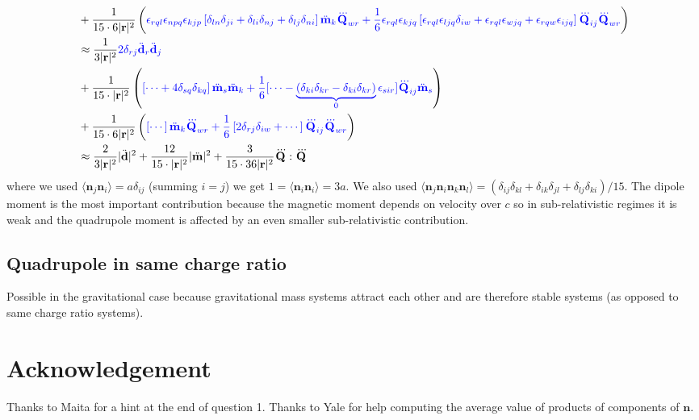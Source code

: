 \documentclass[10pt, a4paper]{article}
\begin{document}
{\begin{align*}
    &+ \dfrac{1}{15 \cdot 6|\mathbf{r}|^2}\left( \textcolor{blue}{\epsilon_{rq l}\epsilon_{npq} \epsilon_{kjp} \left[ \delta_{ln} \delta_{ji} + \delta_{li} \delta_{nj} + \delta_{lj}\delta_{ni} \right] \ddot{\mathbf{m}}_k \dddot{\mathbf{Q}}_{wr}  + \dfrac{1}{6} \epsilon_{rq l} \epsilon_{kj q}\left[ \epsilon_{rq l} \epsilon_{lj q} \delta_{iw} + \epsilon_{rq l} \epsilon_{wj q} + \epsilon_{rq w} \epsilon_{ij q} \right] \dddot{\mathbf{Q}}_{ij} \dddot{\mathbf{Q}}_{wr}} \right)\\
    &\approx \dfrac{1}{3|\mathbf{r}|^2}\textcolor{blue}{2 \delta_{rj}  \ddot{\mathbf{d}}_r\ddot{\mathbf{d}}_j} \\ 
    &+ \dfrac{1}{15\cdot |\mathbf{r}|^2} \left(\textcolor{blue}{ \left[ \cdots + 4\delta_{sq}\delta_{kq} \right] \ddot{\mathbf{m}}_s\ddot{\mathbf{m}}_k  + \dfrac{1}{6}[ \cdots -\underbrace{(\delta_{ki}\delta_{kr} - \delta_{ki}\delta_{kr})}_0 \epsilon_{sir}] \dddot{\mathbf{Q}}_{ij}\ddot{\mathbf{m}}_s} \right)\\
    &+ \dfrac{1}{15 \cdot 6|\mathbf{r}|^2}\left( \textcolor{blue}{ \left[ \cdots \right] \ddot{\mathbf{m}}_k \dddot{\mathbf{Q}}_{wr}  + \dfrac{1}{6} \left[2 \delta_{rj} \delta_{iw} + \cdots  \right] \dddot{\mathbf{Q}}_{ij} \dddot{\mathbf{Q}}_{wr}} \right)\\
    &\approx  \dfrac{2}{3|\mathbf{r}|^2}  |\ddot{\mathbf{d}}|^2 + \dfrac{12}{15\cdot |\mathbf{r}|^2} |\ddot{\mathbf{m}}|^2 + \dfrac{3}{15 \cdot 36|\mathbf{r}|^2} \dddot{\mathbf{Q}} : \dddot{\mathbf{Q}}
\end{align*}
where we used $\langle \mathbf{n}_j \mathbf{n}_i \rangle = a \delta_{ij}$ (summing $i=j$) we get $1 = \langle \mathbf{n}_i \mathbf{n}_i \rangle = 3 a $. We also used $\langle \mathbf{n}_j \mathbf{n}_i \mathbf{n}_k \mathbf{n}_l \rangle = (\delta_{ij}\delta_{kl} + \delta_{ik}\delta_{jl} + \delta_{lj}\delta_{ki})/15$. The dipole moment is the most important contribution because the magnetic moment depends on velocity over $c$ so in sub-relativistic regimes it is weak and the quadrupole moment is affected by an even smaller sub-relativistic contribution. 


\subsection{Quadrupole in same charge ratio}
Possible in the gravitational case because gravitational mass systems attract each other and are therefore stable systems (as opposed to same charge ratio systems). 



\section{Acknowledgement}
Thanks to Maita for a hint at the end of question 1. Thanks to Yale for help computing the average value of products of components of $\mathbf{n}$. 
}
\makereferences


\end{document}
